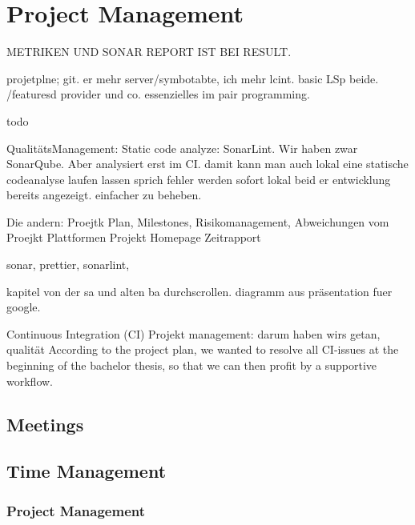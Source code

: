 \section{Project Management}
\label{section:project_management}

METRIKEN UND SONAR REPORT IST BEI RESULT.


projetplne; git. er mehr server/symbotabte, ich mehr lcint.
basic LSp beide. /featuresd provider und co. essenzielles im pair programming. 

todo

QualitätsManagement: Static code analyze: SonarLint. \cite{sonar-lint}
Wir haben zwar SonarQube. Aber analysiert erst im CI.
damit kann man auch lokal eine statische codeanalyse laufen lassen sprich fehler werden sofort lokal beid er
entwicklung bereits angezeigt. einfacher zu beheben.


Die andern:
Proejtk Plan, Milestones, Risikomanagement, Abweichungen vom Proejkt Plattformen
Projekt Homepage
Zeitrapport



sonar, prettier, sonarlint,

kapitel von der sa und alten ba durchscrollen.
diagramm aus präsentation fuer google.

Continuous Integration (CI)
Projekt management: darum haben wirs getan, qualität
According to the project plan, we wanted to resolve all CI-issues at the beginning of the bachelor thesis, so that we can then profit by a supportive workflow.



\subsection{Meetings}

\subsection{Time Management}
\subsubsection{Project Management}


